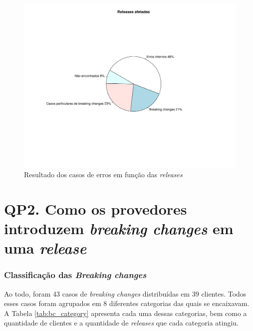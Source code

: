 \begin{figure}
    \centering
    \includegraphics[scale=0.9]{figuras/pre_res_rq1.pdf}
    \caption{Resultado dos casos de erros em função das \textit{releases}}
    \label{fig:pre_res_rq1}
\end{figure}{}

\section{QP2. Como os provedores introduzem \textit{breaking changes} em uma \textit{release}}
\label{res:qp2}

\subsubsection{\textbf{Classificação das \textit{Breaking changes}}}

Ao todo, foram 43 casos de \textit{breaking changes} distribuídas em 39 clientes. Todos esses casos foram agrupados em 8 diferentes categorias das quais se encaixavam. A Tabela \ref{tab:bc_category} apresenta cada uma dessas categorias, bem como a quantidade de clientes e a quantidade de \textit{releases} que cada categoria atingiu.

